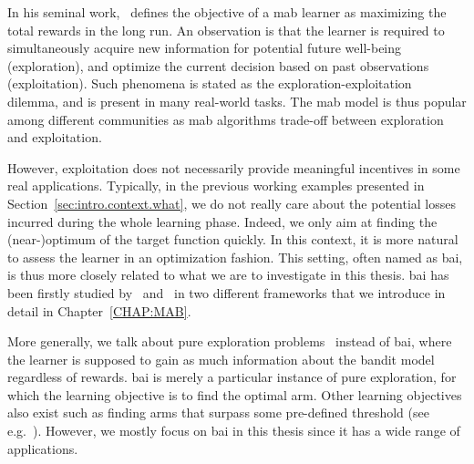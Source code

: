
In his seminal work,~\cite{robbins1952} defines the objective of a \gls{mab} learner as maximizing the total rewards in the long run. An observation is that the learner is required to simultaneously acquire new information for potential future well-being (exploration), and optimize the current decision based on past observations (exploitation). Such phenomena is stated as the \gls{exploration-exploitation dilemma}, and is present in many real-world tasks. The \gls{mab} model is thus popular among different communities as \gls{mab} algorithms trade-off between exploration and exploitation.

However, exploitation does not necessarily provide meaningful incentives in some real applications. Typically, in the previous working examples presented in Section~\ref{sec:intro.context.what}, we do not really care about the potential losses incurred during the whole learning phase. Indeed, we only aim at finding the (near-)optimum of the target function quickly. In this context, it is more natural to assess the learner in an optimization fashion. This setting, often named as \gls{bai}, is thus more closely related to what we are to investigate in this thesis. \gls{bai} has been firstly studied by~\cite{even-dar2003confidence} and~\cite{bubeck2009pure} in two different frameworks that we introduce in detail in Chapter~\ref{CHAP:MAB}.

More generally, we talk about \gls{pure exploration} problems~\citep{bubeck2011pure} instead of \gls{bai}, where the learner is supposed to gain as much information about the bandit model regardless of rewards. \gls{bai} is merely a particular instance of pure exploration, for which the learning objective is to find the optimal arm. Other learning objectives also exist such as finding arms that surpass some pre-defined threshold (see e.g.~\citealt{locatelli2016thresholding}). However, we mostly focus on \gls{bai} in this thesis since it has a wide range of applications.


